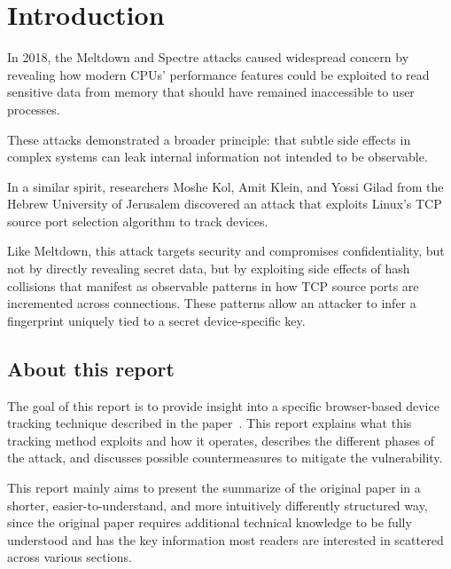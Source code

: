 \documentclass[twocolumn]{report}
\begin{document}
\fontsize{7pt}{8pt}\selectfont
{}



\clearpage
{}
\tableofcontents
\clearpage
\clearpage

\pagestyle{plain}
\clearpage

\section{Introduction}
\label{sec:introduction}

In 2018, the \alert{Meltdown} and \alert{Spectre} attacks caused widespread concern by revealing how modern CPUs’ performance features could be exploited to read sensitive data from memory that should have remained inaccessible to user processes.

These attacks demonstrated a broader principle: that subtle side effects in complex systems can leak internal information not intended to be observable.

In a similar spirit, researchers Moshe Kol, Amit Klein, and Yossi Gilad from the Hebrew University of Jerusalem discovered an attack that exploits Linux’s \alert{TCP source port selection algorithm} to track devices.

Like Meltdown, this attack targets \alert{security} and compromises confidentiality, but not by directly revealing secret data, but by exploiting side effects of \alert{hash collisions} that manifest as observable patterns in how \alert{TCP source ports} are incremented across connections. These patterns allow an attacker to infer a fingerprint uniquely tied to a \alert{secret device-specific key}.

\subsection{About this report}
\label{sec:goal_of_this_report}

The goal of this report is to provide insight into a specific browser-based device tracking technique described in the paper~\cite{kol2022devicetrackinglinuxsnew}. This report explains what this tracking method exploits and how it operates, describes the different phases of the attack, and discusses possible countermeasures to mitigate the vulnerability.

This report mainly aims to present the \alert{summarize} of the original paper in a \alert{shorter}, \alert{easier-to-understand}, and \alert{more intuitively differently structured way}, since the original paper requires additional technical knowledge to be fully understood and has the key information most readers are interested in scattered across various sections.
\end{document}

